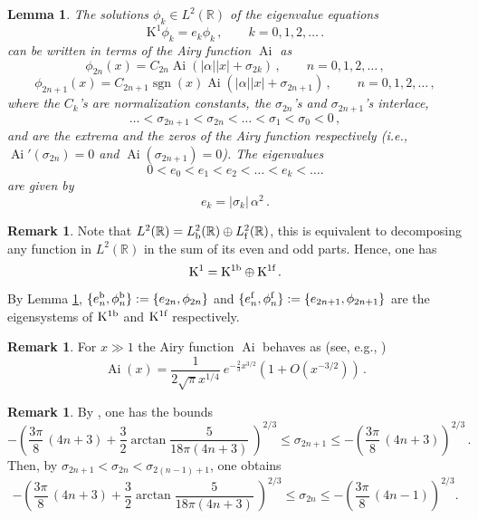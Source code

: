 \documentclass[a4paper,11pt,reqno]{amsart}
\newtheorem{lemma}[theorem]{Lemma}
\theoremstyle{definition}
\newtheorem{remark}[theorem]{Remark}
\numberwithin{equation}{section}
\DeclareMathOperator{\sgn}{sgn}
\newcommand{\RE}{\mathbb R}
\newcommand{\Ai}{\operatorname{Ai}}
\newcommand{\bos}{\text{\rm b}}
\newcommand{\fer}{\text{\rm f}}
\begin{document}
\begin{lemma}\label{r:airy}
The solutions $\phi_k\in L^{2}(\RE)$ of the  eigenvalue equations   
    \begin{equation*}%
        {\mathrm{K}}^{1} \phi_k = e_k \phi_k\,, \qquad  k = 0,1,2,\dots\,.
    \end{equation*}
    can be written in terms of the Airy function $\Ai$ as
    \begin{equation}\label{phi-even}
        \phi_{2n}(x) = C_{2n} \Ai(|\alpha||x| + \sigma_{2k})\,,\qquad n = 0,1,2,\dots\,,
    \end{equation}
    \begin{equation}\label{phi-odd}
        \phi_{2n+1}(x) = C_{2n+1} \sgn(x) \Ai(|\alpha||x| + \sigma_{2n+1})\,,\qquad n = 0,1,2,\dots\,,
    \end{equation}
where the $C_k$'s are normalization constants,  
the $\sigma_{2n}$'s and $\sigma_{2n+1}$'s interlace, 
\[\dots<\sigma_{2n+1}<\sigma_{2n}
<\dots<\sigma_{1}<\sigma_{0}<0\,,
\]
and are the  extrema  and the zeros   of the Airy function respectively (i.e., $\Ai'(\sigma_{2n})=0$ and   $\Ai(\sigma_{2n+1}) =0$). The eigenvalues 
\[0<e_0<e_1<e_2<\dots<e_k<\dots. \]
are given by
\begin{equation*}%
    e_k = |\sigma_k|\,\alpha^2\,.
\end{equation*}
\end{lemma}
\begin{remark}\label{ev/odd} Note that $L^{2}(\RE)=L^{2}_{\bos}(\RE)\oplus L^{2}_{\fer}(\RE)$, this is equivalent to decomposing any function in $L^2(\RE)$ in the sum of its even and odd parts. Hence,  
one has \[\mathrm{K}^{1}=\mathrm{K}^{1\bos}\oplus\mathrm{K}^{1\fer}\,.
\] 
By Lemma \ref{r:airy}, $\{e^{\bos}_{n},\phi_{n}^{\bos}\}:=\{ e_{2n},\phi_{2n}\}$ and $\{e^{\fer}_{n},\phi_{n}^{\fer}\}:=\{e_{2n+1},\phi_{2n+1}\}$ are the eigensystems of $\mathrm{K}^{1\bos}$ and $\mathrm{K}^{1\fer}$ respectively.
\end{remark}
\begin{remark}
For $x \gg 1$ the Airy function $\Ai$ behaves as  (see, e.g., \cite[Sec. 10.4]{AS})
    \begin{equation}\label{asym_Airy}
    \Ai(x) =\frac{1}{2 \sqrt{\pi} x^{1 / 4}}\ e^{-\frac{2}{3} x^{3 / 2}} \left(1 + O(x^{-3 / 2})\right)\, .
\end{equation}
\end{remark}
\begin{remark} By \cite{Hethcote}, one has the bounds
\[
-\left(\frac{3\pi}{8}\,(4n+3)+\frac32\arctan\frac5{18\pi(4n+3)}\ \right)^{2/3}\le \sigma_{2n+1}\le-\left(\frac{3\pi}{8}\,(4n+3)\right)^{2/3}\,.
\] 
Then, by $\sigma_{2n+1}<\sigma_{2n}<\sigma_{2(n-1)+1}$, one obtains
\[
-\left(\frac{3\pi}{8}\,(4n+3)+\frac32\arctan\frac5{18\pi(4n+3)}\ \right)^{2/3}\le \sigma_{2n}\le
-\left(\frac{3\pi}{8}\,(4n-1)
\right)^{2/3}.
\] 
\end{remark}
\end{document}
